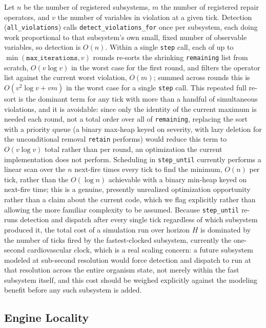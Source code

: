 \documentclass[11pt]{article}
\begin{document}
Let $n$ be the number of registered subsystems, $m$ the number of registered repair operators, and $v$ the number of variables in violation at a given tick. Detection (\texttt{all\_violations}) calls \texttt{detect\_violations\_for} once per subsystem, each doing work proportional to that subsystem's own small, fixed number of observable variables, so detection is $O(n)$. Within a single \texttt{step} call, each of up to $\min(\texttt{max\_iterations}, v)$ rounds re-sorts the shrinking \texttt{remaining} list from scratch, $O(v \log v)$ in the worst case for the first round, and filters the operator list against the current worst violation, $O(m)$; summed across rounds this is $O(v^2 \log v + vm)$ in the worst case for a single \texttt{step} call. This repeated full re-sort is the dominant term for any tick with more than a handful of simultaneous violations, and it is avoidable: since only the identity of the current maximum is needed each round, not a total order over all of \texttt{remaining}, replacing the sort with a priority queue (a binary max-heap keyed on severity, with lazy deletion for the unconditional removal \texttt{retain} performs) would reduce this term to $O(v \log v)$ total rather than per round, an optimization the current implementation does not perform. Scheduling in \texttt{step\_until} currently performs a linear scan over the $n$ next-fire times every tick to find the minimum, $O(n)$ per tick, rather than the $O(\log n)$ achievable with a binary min-heap keyed on next-fire time; this is a genuine, presently unrealized optimization opportunity rather than a claim about the current code, which we flag explicitly rather than allowing the more familiar complexity to be assumed. Because \texttt{step\_until} re-runs detection and dispatch after every single tick regardless of which subsystem produced it, the total cost of a simulation run over horizon $H$ is dominated by the number of ticks fired by the fastest-clocked subsystem, currently the one-second cardiovascular clock, which is a real scaling concern: a future subsystem modeled at sub-second resolution would force detection and dispatch to run at that resolution across the entire organism state, not merely within the fast subsystem itself, and this cost should be weighed explicitly against the modeling benefit before any such subsystem is added.

\subsection{Engine Locality}
\end{document}
